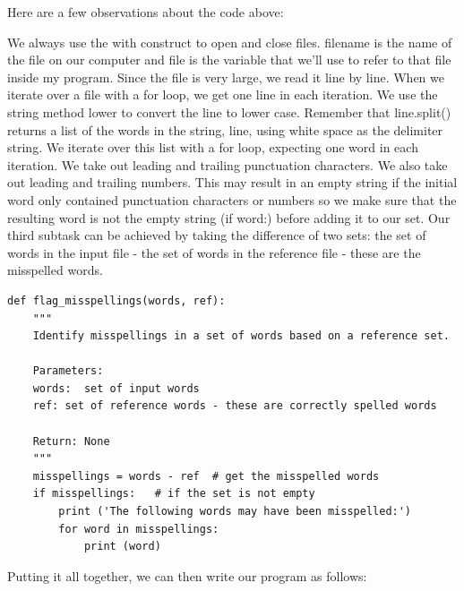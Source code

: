 \documentclass{article}
\begin{document}
Here are a few observations about the code above:

We always use the with construct to open and close files.  
filename is the name of the file on our computer and file is the variable that we'll use to refer to that file inside my program. 
Since the file is very large, we read it line by line. When we iterate over a file with a for loop, we get one line in each iteration.  
We use the string method  lower to convert the line to lower case.
Remember that line.split() returns a list of the words in the string, line, using white space as the delimiter string.
We iterate over this list with a for loop, expecting one word in each iteration.
We take out leading and trailing punctuation characters.  We also take out leading and trailing numbers.  This may result in an empty string if the initial word only contained punctuation characters or numbers so we make sure that the resulting word is not the empty string (if word:) before adding it to our set. 
Our third subtask can be achieved by taking the difference of two sets:  the set of words in the input file - the set of words in the reference file - these are the misspelled words.

\begin{lstlisting}
def flag_misspellings(words, ref):
    """
    Identify misspellings in a set of words based on a reference set.

    Parameters: 
    words:  set of input words
    ref: set of reference words - these are correctly spelled words

    Return: None
    """
    misspellings = words - ref  # get the misspelled words
    if misspellings:   # if the set is not empty
        print ('The following words may have been misspelled:')
        for word in misspellings:
            print (word)
\end{lstlisting}

Putting it all together, we can then write our program as follows:
\end{document}
